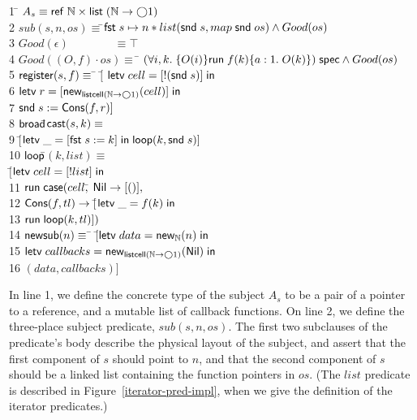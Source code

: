 \begin{tabbing}
1 \qquad \= $A_s \equiv \mathsf{ref}\;\mathbb{N} \times \mathsf{list}\;{(\mathbb{N} \to \bigcirc{1})}$
\\[0.5em]
2 \> $sub(s, n, os) \equiv$\=$ \mathsf{fst}\; s \mapsto n * 
              list(\mathsf{snd}\; s, map\; \mathsf{snd}\; os) \land Good(os)$ 
\\[0.5em]
3 \> $Good(\epsilon) \!\qquad\qquad \equiv \top$ \\
4 \> $Good((O,f)\cdot os) \equiv\; $\=
   ${(\forall i,k.\; \{{O(i)}\}{\mathsf{run}\;{f(k)}}\{{a:1}.\;{O(k)}\})}\;\mathsf{spec} \land Good(os)$ 
\\[0.5em]

5 \> $\mathsf{register}(s, f) \equiv$ \=
         $[$\= $\mathsf{letv}\;cell = [!(\mathsf{snd}\; s)]\;\mathsf{in}\;$ \\
6 \> \> \> $\mathsf{letv}\;r = [\mathsf{new}_{\mathsf{listcell}{(\mathbb{N} \to \bigcirc{1})}}(cell)]\;\mathsf{in}\;$ \\
7 \> \> \> $\mathsf{snd}\; s := \mathsf{Cons}(f, r)]$
\\[0.5em]

8  \> $\mathsf{broad}$\=$\mathsf{cast}(s, k) \equiv$ \\
9  \>  \> $[$\=$\mathsf{letv}\;\_ = [\mathsf{fst}\; s := k]\;\mathsf{in}\;\mathsf{loop}(k, \mathsf{snd}\; s)]$ 
\\[0.5em]


10 \> $\mathsf{loop}$\=$(k, list) \equiv $\\
   \>         \>$[$\=$\mathsf{letv}\;cell = [!list]\;\mathsf{in}\;$ \\
11 \>\>\> $\mathsf{run}\;{}\mathsf{case}(cell,$\= 
            $\mathsf{Nil} \to [()],$ \\
12 \>\>\>\> $\mathsf{Cons}(f, tl) \to [$\=$\mathsf{letv}\;\_ = f(k)\;\mathsf{in}\;$ \\
13  \>\>\>\> \> $\mathsf{run}\;{\mathsf{loop}(k,tl)}])$ \\[0.5em]

14 \> $\mathsf{new}\mathsf{sub}(n) \equiv$ \=
          $[$\=$\mathsf{letv}\;data = \mathsf{new}_{\mathbb{N}}(n)\;\mathsf{in}\;$ \\
15 \> \> \> $\mathsf{letv}\;callbacks = \mathsf{new}_{\mathsf{listcell}{(\mathbb{N} \to \bigcirc{1})}}(\mathsf{Nil})\;\mathsf{in}\;$ \\
16 \> \> \> $(data, callbacks)]$
\end{tabbing}


In line 1, we define the concrete type of the subject $A_s$ to be a
pair of a pointer to a reference, and a mutable list of callback
functions. On line 2, we define the three-place subject predicate,
$sub(s,n,os)$. The first two subclauses of the predicate's body
describe the physical layout of the subject, and assert that the first
component of $s$ should point to $n$, and that the second component of
$s$ should be a linked list containing the function pointers in
$os$. (The $list$ predicate is described in
Figure~\ref{iterator-pred-impl}, when we give the definition of the
iterator predicates.)

